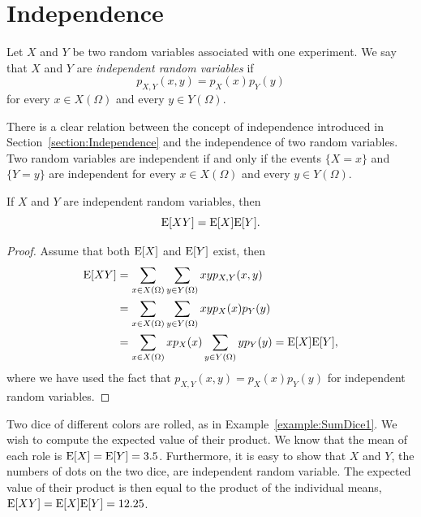 \section{Independence}

Let $X$ and $Y$ be two random variables associated with one experiment.
We say that $X$ and $Y$ are \emph{independent random variables} if 
\begin{equation*}
p_{X,Y} (x,y) = p_X (x) p_Y (y)
\end{equation*}
for every $x \in X(\Omega)$ and every $y \in Y(\Omega)$.

There is a clear relation between the concept of independence introduced in Section~\ref{section:Independence} and the independence of two random variables.
Two random variables are independent if and only if the events $\{ X = x \}$ and $\{ Y = y \}$ are independent for every $x \in X(\Omega)$ and every $y \in Y(\Omega)$.

\begin{theorem}
If $X$ and $Y$ are independent random variables, then
\begin{equation*}
\mathrm{E} [X Y] = \mathrm{E} [X] \mathrm{E} [Y] .
\end{equation*}
\end{theorem}
\begin{proof}
Assume that both $\mathrm{E} [X]$ and $\mathrm{E}[Y]$ exist, then
\begin{equation*}
\begin{split}
\mathrm{E} [XY]
&= \sum_{x \in X(\Omega)} \sum_{y \in Y(\Omega)} x y p_{X,Y} (x,y) \\
&= \sum_{x \in X(\Omega)} \sum_{y \in Y(\Omega)} x y p_X (x) p_Y (y) \\
&= \sum_{x \in X(\Omega)} x p_X (x) \sum_{y \in Y(\Omega)} y p_Y (y)
= \mathrm{E} [X] \mathrm{E} [Y] ,
\end{split}
\end{equation*}
where we have used the fact that $p_{X,Y} (x,y) = p_X (x) p_Y (y)$ for independent random variables.
\end{proof}

\begin{example}
Two dice of different colors are rolled, as in Example~\ref{example:SumDice1}.
We wish to compute the expected value of their product.
We know that the mean of each role is $\mathrm{E} [X] = \mathrm{E} [Y] = 3.5$.
Furthermore, it is easy to show that $X$ and $Y$, the numbers of dots on the two dice, are independent random variable.
The expected value of their product is then equal to the product of the individual means, $\mathrm{E} [XY] = \mathrm{E} [X] \mathrm{E} [Y] = 12.25$.
\end{example}

